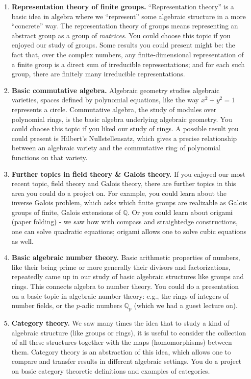 \documentclass[11pt]{article}
\begin{document}
\begin{enumerate}

\item {\bf Representation theory of finite groups.} ``Representation theory'' is a basic idea in algebra where we ``represent'' some algebraic structure in a more ``concrete'' way. The representation theory of groups means representing an abstract group as a group of \emph{matrices}. You could choose this topic if you enjoyed our study of groups. Some results you could present might be: the fact that, over the complex numbers, any finite-dimensional representation of a finite group is a direct sum of irreducible representations; and for each such group, there are finitely many irreducible representations.

\item {\bf Basic commutative algebra.} Algebraic geometry studies algebraic varieties, spaces defined by polynomial equations, like the way $x^2+y^2=1$ represents a circle. Commutative algebra, the study of modules over polynomial rings, is the basic algebra underlying algebraic geometry. You could choose this topic if you liked our study of rings. A possible result you could present is Hilbert's Nullstellensatz, which gives a precise relationship between an algebraic variety and the commutative ring of polynomial functions on that variety.

\item {\bf Further topics in field theory \& Galois theory.} If you enjoyed our most recent topic, field theory and Galois theory, there are further topics in this area you could do a project on. For example, you could learn about the inverse Galois problem, which asks which finite groups are realizable as Galois groups of finite, Galois extensions of $\mathbb{Q}$. Or you could learn about origami (paper folding) - we saw how with compass and straightedge constructions, one can solve quadratic equations; origami allows one to solve cubic equations as well.

\item {\bf Basic algebraic number theory.} Basic arithmetic properties of numbers, like their being prime or more generally their divisors and factorizations, repeatedly came up in our study of basic algebraic structures like groups and rings. This connects algebra to number theory. You could do a presentation on a basic topic in algebraic number theory: e.g., the rings of integers of number fields, or the $p$-adic numbers $\mathbb{Q}_p$ (which we had a guest lecture on).

\item {\bf Category theory.} We saw many times the idea that to study a kind of algebraic structure (like groups or rings), it is useful to consider the collection of all these structures together with the maps (homomorphisms) between them. Category theory is an abstraction of this idea, which allows one to compare and transfer results in different algebraic settings. You do a project on basic category theoretic definitions and examples of categories.

\end{enumerate}
\end{document}
